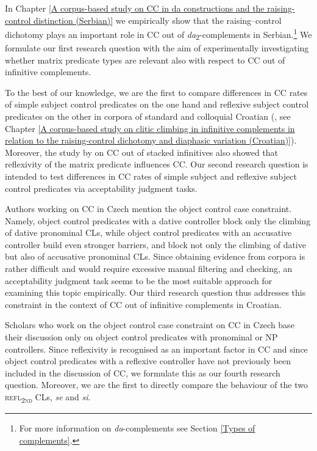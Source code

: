 In Chapter \ref{A corpus-based study on CC in da constructions and the raising-control distinction (Serbian)} we empirically show that the raising--control dichotomy plays an important role in CC out of \textit{da}\textsubscript{2}-complements in Serbian.\footnote{For more information on \textit{da}-complements see Section \ref{Types of complements}.} We formulate our first research question with the aim of experimentally investigating whether matrix predicate types are relevant also with respect to CC out of infinitive complements.

To the best of our knowledge, we are the first to compare differences in CC rates of simple subject control predicates on the one hand and reflexive subject control predicates on the other in corpora of standard and colloquial Croatian (\citealt[cf.][]{KJH19}, see Chapter \ref{A corpus-based study on clitic climbing in infinitive complements in relation to the raising-control dichotomy and diaphasic variation (Croatian)}). Moreover, the study by \citet*[][]{HKJ18} on CC out of stacked infinitives also showed that reflexivity of the matrix predicate influences CC. Our second research question is intended to test differences in CC rates of simple subject and reflexive subject control predicates via acceptability judgment tasks. 

Authors working on CC in Czech mention the object control case constraint. Namely, object control predicates with a dative controller block only the climbing of dative pronominal CLs, while object control predicates with an accusative controller build even stronger barriers, and block not only the climbing of dative but also of accusative pronominal CLs. Since obtaining evidence from corpora is rather difficult and would require excessive manual filtering and checking, an acceptability judgment task seems to be the most suitable approach for examining this topic empirically. Our third research question thus addresses this constraint in the context of CC out of infinitive complements in Croatian.

Scholars who work on the object control case constraint on CC in Czech base their discussion only on object control predicates with pronominal or NP controllers. Since reflexivity is recognised as an important factor in CC and since object control predicates with a reflexive controller have not previously been included in the discussion of CC, we formulate this as our fourth research question. Moreover, we are the first to directly compare the behaviour of the two \textsc{refl\textsubscript{2nd}} CLs, \textit{se} and \textit{si}. 


